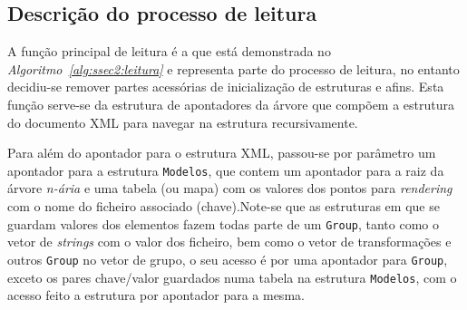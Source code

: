 \subsection{Descrição do processo de leitura}

A função principal de leitura é a que está demonstrada no
\emph{Algoritmo~\ref{alg:ssec2:leitura}} e representa parte do processo de
leitura, no entanto decidiu-se remover partes acessórias de inicialização de
estruturas e afins. Esta função serve-se da estrutura de apontadores da árvore
que compõem a estrutura do documento XML para navegar na estrutura
recursivamente. 

Para além do apontador para o estrutura XML, passou-se por
parâmetro um apontador para a estrutura \texttt{Modelos}, que contem um
apontador para a raiz da árvore \emph{n-ária} e uma tabela (ou mapa) com os
valores dos pontos para \emph{rendering} com o nome do ficheiro associado
(chave).Note-se que as estruturas em que se guardam valores dos elementos fazem
todas parte de um \texttt{Group}, tanto como o vetor de
\emph{strings} com o valor dos ficheiro, bem como o vetor de transformações
e outros \texttt{Group} no vetor de grupo, o seu acesso é por uma apontador
para \texttt{Group}, exceto os pares chave/valor guardados numa tabela na
estrutura \texttt{Modelos}, com o acesso feito a estrutura por apontador para
a mesma.  

